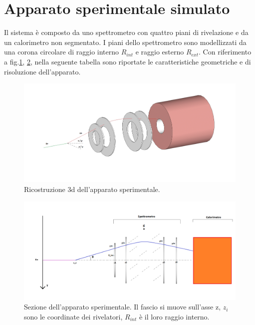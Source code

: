 \documentclass[8pt]{extarticle}
\begin{document}
\section{Apparato sperimentale simulato} \label{sec:apparato}
\justify
Il sistema è composto da uno spettrometro con quattro piani di rivelazione e da un calorimetro non segmentato. I piani dello spettrometro sono modellizzati da una corona circolare di raggio interno $R_{int}$ e raggio esterno $R_{ext}$. Con riferimento a fig.\ref{fig:apparato_rare_3d}, \ref{fig:apparato_rare_2d}, nella seguente tabella sono riportate le caratteristiche geometriche e di risoluzione dell'apparato. \\


\begin{figure}
\includegraphics[scale=0.3]{apparato_rare_3d}
\caption{Ricostruzione 3d dell'apparato sperimentale.}
\label{fig:apparato_rare_3d}
\end{figure}

\begin{figure}
\includegraphics[scale=0.3]{apparato_rare_2d}
\caption{Sezione dell'apparato sperimentale. Il fascio si muove sull'asse z, $z_i$ sono le coordinate dei rivelatori, $R_{int}$ è il loro raggio interno.}
\label{fig:apparato_rare_2d}
\end{figure}
\end{document}
